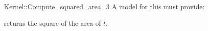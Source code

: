 \begin{ccRefFunctionObjectConcept}{Kernel::Compute_squared_area_3}
A model for this must provide:


       {returns the square of the area of $t$. }

\end{ccRefFunctionObjectConcept}
